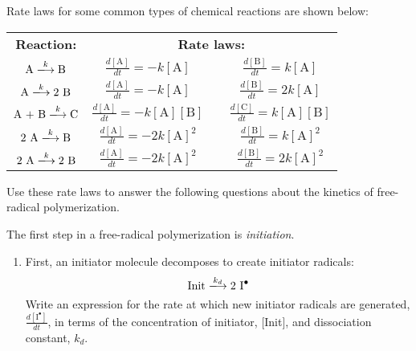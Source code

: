 \begin{activity}
\begin{instructornotes}
\end{instructornotes}


\begin{model}
	\label{\labelbase:mdl:kineticeqns}

	Rate laws for some common types of chemical reactions are shown below:
	
	\vspace{-6pt}
	\begin{center}
		\renewcommand{\arraystretch}{2}
		\begin{tabular}{c c c c}
			\hspace{2cm}\textbf{Reaction:}\hspace{2cm} & \multicolumn{3}{c}{\hspace{0.5cm}\textbf{Rate laws:}\hspace{0.5cm}} \\
			$ \text{A} \xlongrightarrow{k} \text{B}$ & $\frac{d[\text{A}]}{dt} = -k[\text{A}]$ && $\frac{d[\text{B}]}{dt} = k[\text{A}]$ \\
			$ \text{A} \xlongrightarrow{k} 2\text{ B}$ & $\frac{d[\text{A}]}{dt} = -k[\text{A}]$ && $\frac{d[\text{B}]}{dt} = 2k[\text{A}]$ \\
			$\text{A + B} \xlongrightarrow{k} \text{C}$ & $\frac{d[\text{A}]}{dt} = -k[\text{A}][\text{B}]$ && $\frac{d[\text{C}]}{dt} = k[\text{A}][\text{B}]$ \\
			$\text{2 A} \xlongrightarrow{k} \text{B}$ & $\frac{d[\text{A}]}{dt} = -2k[\text{A}]^2$ && $\frac{d[\text{B}]}{dt} = k[\text{A}]^2$ \\
			$\text{2 A} \xlongrightarrow{k} \text{2 B}$ & $\frac{d[\text{A}]}{dt} = -2k[\text{A}]^2$ && $\frac{d[\text{B}]}{dt} = 2 k[\text{A}]^2$ 
		\end{tabular}
	\end{center}
	Use these rate laws to answer the following questions about the kinetics of free-radical polymerization.
	
\end{model}


\begin{ctqs}

	\question The first step in a free-radical polymerization is \emph{initiation}.  
		
		\begin{enumerate}
		
			\item First, an initiator molecule decomposes to create initiator radicals: \label{\labelbase:ctq:initdecomp}
				\begin{equation*}
					\text{Init} \xlongrightarrow{k_d} \text{2 \ce{I^.}}
				\end{equation*}	
				Write an expression for the rate at which new initiator radicals are generated, $\frac{d[\text{I}^{\bullet}]}{dt}$, in terms of the concentration of initiator, [Init], and dissociation constant, $k_d$.
		

\end{enumerate}
\end{ctqs}
\end{activity}
